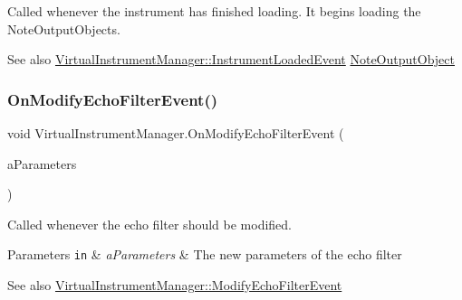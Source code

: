 Called whenever the instrument has finished loading. It begins loading the Note\+Output\+Objects. 

\begin{DoxySeeAlso}{See also}
\hyperlink{class_virtual_instrument_manager_1_1_instrument_loaded_event}{Virtual\+Instrument\+Manager\+::\+Instrument\+Loaded\+Event} \hyperlink{class_note_output_object}{Note\+Output\+Object} 
\end{DoxySeeAlso}
\mbox{\label{group___virtual_instrument_manager_event_types_gae504c6ded8eb68ffb117c207fc25d99d}} 
\subsubsection{\texorpdfstring{On\+Modify\+Echo\+Filter\+Event()}{OnModifyEchoFilterEvent()}}
{\footnotesize\ttfamily void Virtual\+Instrument\+Manager.\+On\+Modify\+Echo\+Filter\+Event (\begin{DoxyParamCaption}\item[{\hyperlink{group___virtual_instrument_manager_event_types_struct_virtual_instrument_manager_1_1_echo_filter_parameters}{Echo\+Filter\+Parameters}}]{a\+Parameters }\end{DoxyParamCaption})}



Called whenever the echo filter should be modified. 


\begin{DoxyParams}[1]{Parameters}
\mbox{\tt in}  & {\em a\+Parameters} & The new parameters of the echo filter\\
\hline
\end{DoxyParams}
\begin{DoxySeeAlso}{See also}
\hyperlink{class_virtual_instrument_manager_1_1_modify_echo_filter_event}{Virtual\+Instrument\+Manager\+::\+Modify\+Echo\+Filter\+Event} 
\end{DoxySeeAlso}
\mbox{\label{group___virtual_instrument_manager_event_types_ga2b310217971075b1b2db67d68fbbea5a}} 
